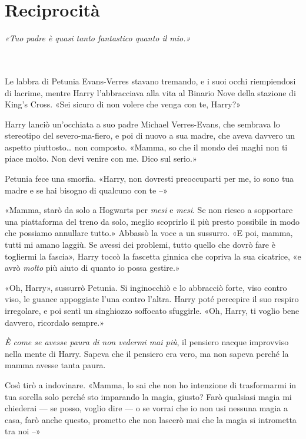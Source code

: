 
\chapter{Reciprocità}
\label{capitolo:7}

\emph{«Tuo padre è quasi tanto fantastico quanto il mio.»}

~\\
~\\

Le labbra di Petunia Evans-Verres stavano tremando, e i suoi occhi riempiendosi di lacrime, mentre Harry l’abbracciava alla vita al Binario Nove della stazione di King’s Cross. «Sei sicuro di non volere che venga con te, Harry?»

Harry lanciò un’occhiata a suo padre Michael Verres-Evans, che sembrava lo stereotipo del severo-ma-fiero, e poi di nuovo a sua madre, che aveva davvero un aspetto piuttosto… non composto. «Mamma, so che il mondo dei maghi non ti piace molto. Non devi venire con me. Dico sul serio.»

Petunia fece una smorfia. «Harry, non dovresti preoccuparti per me, io sono tua madre e se hai bisogno di qualcuno con te –»

«Mamma, starò da solo a Hogwarts per \textit{mesi} e \textit{mesi}. Se non riesco a sopportare una piattaforma del treno da solo, meglio scoprirlo il più presto possibile in modo che possiamo annullare tutto.» Abbassò la voce a un sussurro. «E poi, mamma, tutti mi amano laggiù. Se avessi dei problemi, tutto quello che dovrò fare è togliermi la fascia», Harry toccò la fascetta ginnica che copriva la sua cicatrice, «e avrò \textit{molto} più aiuto di quanto io possa gestire.»

«Oh, Harry», sussurrò Petunia. Si inginocchiò e lo abbracciò forte, viso contro viso, le guance appoggiate l’una contro l’altra. Harry poté percepire il suo respiro irregolare, e poi sentì un singhiozzo soffocato sfuggirle. «Oh, Harry, ti voglio bene davvero, ricordalo sempre.»

\textit{È come se avesse paura di non vedermi mai più}, il pensiero nacque improvviso nella mente di Harry. Sapeva che il pensiero era vero, ma non sapeva perché la mamma avesse tanta paura.

Così tirò a indovinare. «Mamma, lo sai che non ho intenzione di trasformarmi in tua sorella solo perché sto imparando la magia, giusto? Farò qualsiasi magia mi chiederai — se posso, voglio dire — o se vorrai che io non usi nessuna magia a casa, farò anche questo, prometto che non lascerò mai che la magia si intrometta tra noi –»

